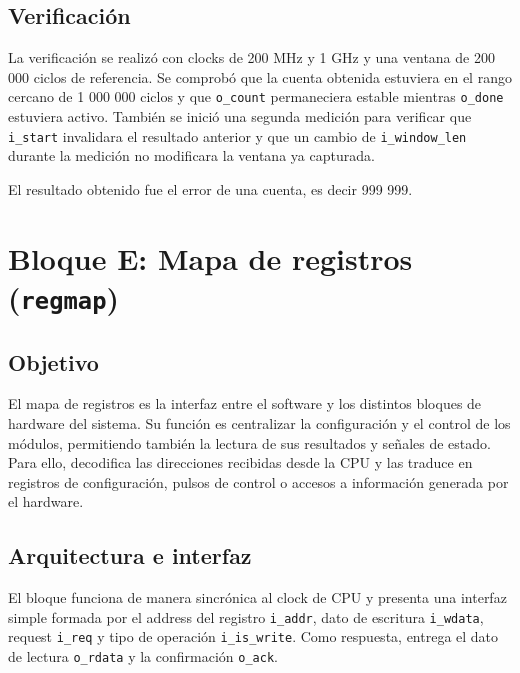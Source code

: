 \documentclass[10pt,a4paper]{article}
\begin{document}
\subsection{Verificación}

La verificación se realizó con clocks de 200 MHz y 1 GHz y una ventana de 200 000
ciclos de referencia. Se comprobó que la cuenta obtenida estuviera en el rango
cercano de 1 000 000 ciclos y que \texttt{o\_count} permaneciera estable mientras
\texttt{o\_done} estuviera activo. También se inició una segunda medición para
verificar que \texttt{i\_start} invalidara el resultado anterior y que un cambio de
\texttt{i\_window\_len} durante la medición no modificara la ventana ya capturada.

El resultado obtenido fue el error de una cuenta, es decir 999 999.

\section{Bloque E: Mapa de registros (\texttt{regmap})}
\label{sec:regmap}

\subsection{Objetivo}

El mapa de registros es la interfaz entre el software y los distintos
bloques de hardware del sistema. Su función es centralizar la configuración y el
control de los módulos, permitiendo también la lectura de sus resultados y señales
de estado. Para ello, decodifica las direcciones recibidas desde la CPU y las
traduce en registros de configuración, pulsos de control o accesos a información
generada por el hardware.

\subsection{Arquitectura e interfaz}

El bloque funciona de manera sincrónica al clock de CPU y presenta una interfaz
simple formada por el address del registro \texttt{i\_addr}, dato de escritura
\texttt{i\_wdata}, request \texttt{i\_req} y tipo de operación
\texttt{i\_is\_write}. Como respuesta, entrega el dato de lectura
\texttt{o\_rdata} y la confirmación \texttt{o\_ack}.
\end{document}
